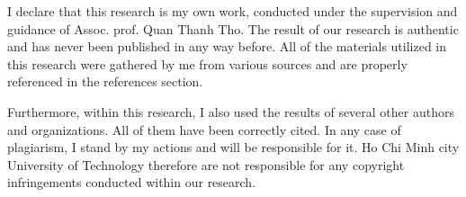 \documentclass[12pt,a4paper,oneside]{book} %
\begin{document}

\coverpage

\frontmatter


\begin{declaration}





  I declare that this research is my own work, conducted under the supervision and guidance of Assoc. prof. Quan Thanh Tho. The result of our research is authentic and has never been published in any way before. All of the materials utilized in this research were gathered by me from various sources and are properly referenced in the references section. 

  Furthermore, within this research, I also used the results of several other authors and organizations. All of them have been correctly cited. In any case of plagiarism, I stand by my actions and will be responsible for it. Ho Chi Minh city University of Technology therefore are not responsible for any copyright infringements conducted within our research.

\end{declaration}
\end{document}

